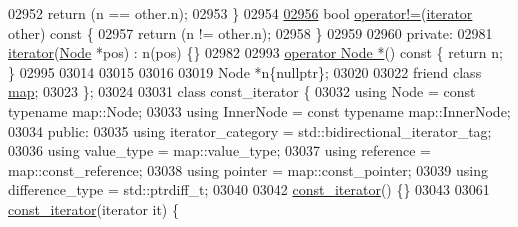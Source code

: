 \begin{DoxyCode}
02952                         \textcolor{keywordflow}{return} (n == other.n);
02953                     \}
02954 
\hypertarget{map2_8h_source_l02956}{}\hyperlink{classaed2_1_1iterator_1_1iterator_a8facdf09114b97042cf3d6403ba1d719_a8facdf09114b97042cf3d6403ba1d719}{02956}                     \textcolor{keywordtype}{bool} \hyperlink{classaed2_1_1iterator_1_1iterator_a8facdf09114b97042cf3d6403ba1d719_a8facdf09114b97042cf3d6403ba1d719}{operator!=}(\hyperlink{classaed2_1_1iterator_1_1iterator}{iterator} other)\textcolor{keyword}{ const }\{
02957                         \textcolor{keywordflow}{return} (n != other.n);
02958                     \}
02959 
02960                 \textcolor{keyword}{private}:
02981                     \hyperlink{classaed2_1_1iterator_1_1iterator_ae488782067dfba96b447080b0db1ed2c_ae488782067dfba96b447080b0db1ed2c}{iterator}(\hyperlink{structaed2_1_1iterator_1_1Node}{Node} *pos) : n(pos) \{\}
02982 
02993                     \hyperlink{classaed2_1_1iterator_1_1iterator_a12950b9a0659e6b9314b1a3a48bd50ac_a12950b9a0659e6b9314b1a3a48bd50ac}{operator Node *}()\textcolor{keyword}{ const }\{ \textcolor{keywordflow}{return} n; \}
02995 
03014 
03015 
03016 
03019                     Node *n\{\textcolor{keyword}{nullptr}\};
03020 
03022                     \textcolor{keyword}{friend} \textcolor{keyword}{class }\hyperlink{classaed2_1_1iterator_1_1iterator_aeda338414e516b47761f994fb78056c6_aeda338414e516b47761f994fb78056c6}{map};
03023                 \};
03024 
03031                 \textcolor{keyword}{class }const\_iterator \{
03032                     \textcolor{keyword}{using} Node = \textcolor{keyword}{const} \textcolor{keyword}{typename} map::Node;
03033                     \textcolor{keyword}{using} InnerNode = \textcolor{keyword}{const} \textcolor{keyword}{typename} map::InnerNode;
03034                 \textcolor{keyword}{public}:
03035                     \textcolor{keyword}{using} iterator\_category = std::bidirectional\_iterator\_tag;
03036                     \textcolor{keyword}{using} value\_type = map::value\_type;
03037                     \textcolor{keyword}{using} reference = map::const\_reference;
03038                     \textcolor{keyword}{using} pointer = map::const\_pointer;
03039                     \textcolor{keyword}{using} difference\_type = std::ptrdiff\_t;
03040 
03042                     \hyperlink{classaed2_1_1iterator_1_1const__iterator_aaa51a026552b907959961fb5e890f786_aaa51a026552b907959961fb5e890f786}{const_iterator}() \{\}
03043 
03061                     \hyperlink{classaed2_1_1iterator_1_1const__iterator_aaa51a026552b907959961fb5e890f786_aaa51a026552b907959961fb5e890f786}{const_iterator}(iterator it) \{

\end{DoxyCode}
